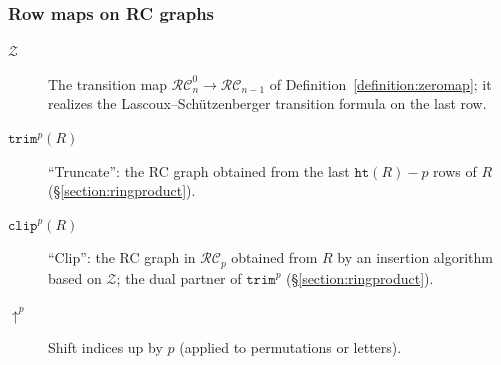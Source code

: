 \documentclass{amsart}
\theoremstyle{definition}
\theoremstyle{remark}
\numberwithin{equation}{subsection}
\newcommand{\shup}{{\uparrow}}
\newcommand{\trm}{\mathtt{trim}}
\newcommand{\zeromap}{\mathcal{Z}}
\newcommand{\hr}{\mathtt{ht}}
\newcommand{\clp}{\mathtt{clip}}
\newcommand{\RC}{\mathcal{RC}}
\begin{document}
\subsubsection*{Row maps on RC graphs}
\begin{description}
\item[$\zeromap$] The transition map $\RC_n^0\to\RC_{n-1}$ of Definition~\ref{definition:zeromap}; it realizes the Lascoux--Sch\"utzenberger transition formula on the last row.
\item[$\trm^p(R)$] ``Truncate'': the RC graph obtained from the last $\hr(R)-p$ rows of $R$ (\S\ref{section:ringproduct}).
\item[$\clp^p(R)$] ``Clip'': the RC graph in $\RC_p$ obtained from $R$ by an insertion algorithm based on $\zeromap$; the dual partner of $\trm^p$ (\S\ref{section:ringproduct}).
\item[$\shup^p$] Shift indices up by $p$ (applied to permutations or letters).
\end{description}
\end{document}
